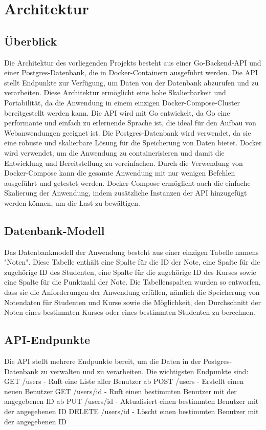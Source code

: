 \documentclass[a4paper,12pt,titlepage]{article}
\begin{document}
\section{Architektur}
\subsection{Überblick}
Die Architektur des vorliegenden Projekts besteht aus einer Go-Backend-API und einer Postgres-Datenbank, die in Docker-Containern ausgeführt werden. Die API stellt Endpunkte zur Verfügung, um Daten von der Datenbank abzurufen und zu verarbeiten. Diese Architektur ermöglicht eine hohe Skalierbarkeit und Portabilität, da die Anwendung in einem einzigen Docker-Compose-Cluster bereitgestellt werden kann.
Die API wird mit Go entwickelt, da Go eine performante und einfach zu erlernende Sprache ist, die ideal für den Aufbau von Webanwendungen geeignet ist. Die Postgres-Datenbank wird verwendet, da sie eine robuste und skalierbare Lösung für die Speicherung von Daten bietet. Docker wird verwendet, um die Anwendung zu containerisieren und damit die Entwicklung und Bereitstellung zu vereinfachen.
Durch die Verwendung von Docker-Compose kann die gesamte Anwendung mit nur wenigen Befehlen ausgeführt und getestet werden. Docker-Compose ermöglicht auch die einfache Skalierung der Anwendung, indem zusätzliche Instanzen der API hinzugefügt werden können, um die Last zu bewältigen.
\subsection{Datenbank-Modell}
Das Datenbankmodell der Anwendung besteht aus einer einzigen Tabelle namens "Noten". Diese Tabelle enthält eine Spalte für die ID der Note, eine Spalte für die zugehörige ID des Studenten, eine Spalte für die zugehörige ID des Kurses sowie eine Spalte für die Punktzahl der Note.
Die Tabellenspalten wurden so entworfen, dass sie die Anforderungen der Anwendung erfüllen, nämlich die Speicherung von Notendaten für Studenten und Kurse sowie die Möglichkeit, den Durchschnitt der Noten eines bestimmten Kurses oder eines bestimmten Studenten zu berechnen.
\subsection{API-Endpunkte}
Die API stellt mehrere Endpunkte bereit, um die Daten in der Postgres-Datenbank zu verwalten und zu verarbeiten. Die wichtigsten Endpunkte sind:
GET /users - Ruft eine Liste aller Benutzer ab
POST /users - Erstellt einen neuen Benutzer
GET /users/{id} - Ruft einen bestimmten Benutzer mit der angegebenen ID ab
PUT /users/{id} - Aktualisiert einen bestimmten Benutzer mit der angegebenen ID
DELETE /users/{id} - Löscht einen bestimmten Benutzer mit der angegebenen ID
\end{document}
